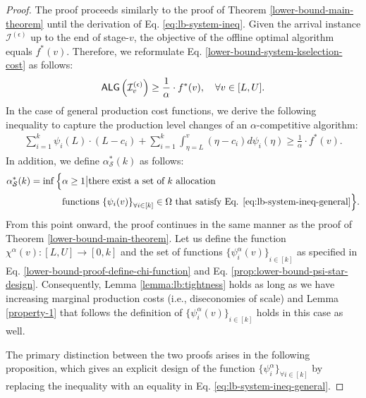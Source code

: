 \begin{proof}
The proof proceeds similarly to the proof of Theorem \ref{lower-bound-main-theorem} until the derivation of Eq. \eqref{eq:lb-system-ineq}. Given the arrival instance $\mathcal{I}^{(\epsilon)}$ up to the end of stage-$v$, the objective of the offline optimal algorithm equals $f^{*}(v)$. Therefore, we reformulate Eq. \eqref{lower-bound-system-kselection-cost} as follows:
\begin{align*} 
    \textsf{ALG}\left(\mathcal{I}_v^{(\epsilon)}\right) \ge \frac{1}{\alpha} \cdot f^{*}(v), \quad \forall v \in [L,U].
\end{align*}
In the case of general production cost functions, we derive the following inequality to capture the production level changes of an $\alpha$-competitive algorithm:
\begin{align}    
\sum_{i=1}^{k} \psi_{i}(L) \cdot (L - c_{i}) +  \sum_{i=1}^{k} \int_{\eta =L}^{v} (\eta - c_{i} )d\psi_{i}(\eta)  \ge \frac{1}{\alpha} \cdot f^{*}(v).
    \label{eq:lb-system-ineq-general}
\end{align}
In addition, we define $\alpha_{\mathcal{S}}^*(k)$  as follows:
\begin{align*} 
\alpha_{\mathcal{S}}^*(k) = \inf \Big\{ &  \alpha \ge 1 \big | \text{there exist a set of } k \text{ allocation}\\  
& \text{functions } {\{\psi_{i}(v)\}}_{\forall i \in [k]}  \in \Omega \text{ that satisfy Eq. \eqref{eq:lb-system-ineq-general}} \Big \}.
\end{align*}
From this point onward, the proof continues in the same manner as the proof of Theorem \ref{lower-bound-main-theorem}. Let us define the function  $\chi^{\alpha}(v):[L,U] \rightarrow [0,k]$ and the set of functions ${\{\psi^{\alpha}_{i}(v)\}}_{i \in [k]}$ as specified in  Eq. \eqref{lower-bound-proof-define-chi-function} and Eq. \eqref{prop:lower-bound-psi-star-design}. Consequently, Lemma \ref{lemma:lb:tightness} holds as long as we have increasing marginal production costs (i.e., diseconomies of scale) and Lemma  \ref{property-1} that follows the definition of ${\{\psi^{\alpha}_{i}(v)\}}_{i \in [k]}$ holds in this case as well.

The primary distinction between the two proofs arises in the following proposition, which gives an explicit design of the function $\{\psi^{\alpha}_{i}\}_{\forall i \in [k]}$ by replacing the inequality with an equality in  Eq. \eqref{eq:lb-system-ineq-general}. 


\end{proof}
